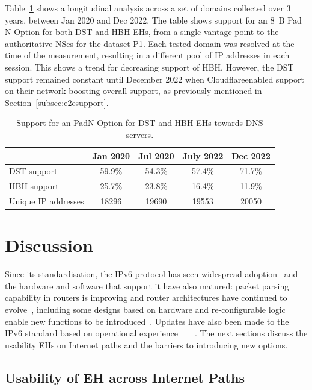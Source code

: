 \documentclass[conference]{IEEEtran}
\begin{document}
Table~\ref{tbl:longitudinal_support} shows a longitudinal analysis
across a set of domains collected over 3 years,  between Jan 2020 and
Dec 2022.  The table shows support for an 8~B Pad N Option for both DST and
HBH EHs, from a single vantage point to the authoritative NSes for the dataset P1.
Each tested domain was resolved at the time of the measurement, resulting in a
different pool of IP addresses in each session. 
This shows a trend for decreasing support of HBH. However, the DST support
remained constant until December 2022 when Cloudflare\texttrademark enabled support on
their network boosting  overall support, as previously
mentioned in Section~\ref{subsec:e2esupport}.

\begin{table}
\caption{Support for an PadN Option for DST and HBH EHs towards DNS servers.}
\begin{tabular}{l|c|c|c|c}
              & Jan 2020 & Jul 2020 & July 2022 & Dec 2022 \\
\hline \hline
DST support   & 59.9\%   & 54.3\%   & 57.4\%    & 71.7\%   \\
HBH support   & 25.7\%   & 23.8\%   & 16.4\%    & 11.9\%   \\
\hline
Unique IP addresses & 18296    & 19690    & 19553     & 20050   
\end{tabular}
\label{tbl:longitudinal_support}
\end{table}


\section{Discussion} 
\label{sec:discussion}

Since its standardisation, the IPv6 protocol has
seen widespread adoption~\cite{v6adoption_ton} and the hardware and software that
support it have also matured: packet parsing capability in routers is improving and
router architectures have continued to evolve~\cite{metamorphosis, hauser2023}, including some designs based on hardware and re-configurable
logic enable new functions to be introduced~\cite{cisco-silicon-one}. Updates  have also been made to the IPv6 standard based on operational experience~\cite{RFC5722}~\cite{RFC6946}~\cite{RFC6564}~\cite{RFC8200}.
The next sections discuss the usability EHs on Internet paths and the barriers to introducing new options.

\subsection{Usability of EH across Internet Paths}
\end{document}
